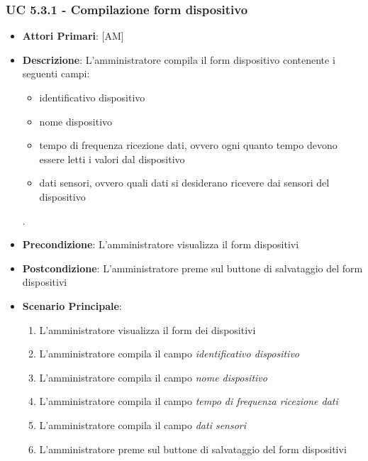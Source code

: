 			\subsubsection{UC 5.3.1 - Compilazione form dispositivo}
			\begin{itemize}
				\item \textbf{Attori Primari}: [AM]
				\item \textbf{Descrizione}: L'amministratore compila il form dispositivo contenente i seguenti campi:
				\begin{itemize}
					\item identificativo dispositivo
					\item nome dispositivo
					\item tempo di frequenza ricezione dati, ovvero ogni quanto tempo devono essere letti i valori dal dispositivo
					\item dati sensori, ovvero quali dati si desiderano ricevere dai sensori del dispositivo
				\end{itemize}.
				\item \textbf{Precondizione}: L'amministratore visualizza il form dispositivi
				\item \textbf{Postcondizione}: L'amministratore preme sul buttone di salvataggio del form dispositivi
				\item \textbf{Scenario Principale}:
				\begin{enumerate}
					\item{L'amministratore visualizza il form dei dispositivi}
					\item{L'amministratore compila il campo \textit{identificativo dispositivo}}
					\item{L'amministratore compila il campo \textit{nome dispositivo}}
					\item{L'amministratore compila il campo \textit{tempo di frequenza ricezione dati}}
					\item{L'amministratore compila il campo \textit{dati sensori}}
					\item{L'amministratore preme sul buttone di salvataggio del form dispositivi}
				\end{enumerate}
			\end{itemize}
			

